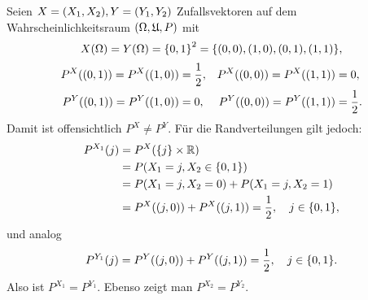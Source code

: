 \documentclass{lecture}
\begin{document}
    \begin{example}
        Seien \(X = \parentheses*{X_1, X_2}, Y = \parentheses*{Y_1, Y_2}\) Zufallsvektoren auf dem Wahrscheinlichkeitsraum \(\parentheses*{\Omega, \mathfrak{U}, P}\) mit
        \[
            X\parentheses*{\Omega} = Y\parentheses*{\Omega} = \braces*{0, 1}^2 = \braces*{\parentheses*{0, 0}, \parentheses*{1, 0}, \parentheses*{0, 1}, \parentheses*{1, 1}},
        \]
        \begin{align*}
            P^X\parentheses*{\parentheses*{0, 1}} = P^X\parentheses*{\parentheses*{1, 0}} &= \frac{1}{2}, & P^X\parentheses*{\parentheses*{0, 0}} = P^X\parentheses*{\parentheses*{1, 1}} &= 0,\\
            P^Y\parentheses*{\parentheses*{0, 1}} = P^Y\parentheses*{\parentheses*{1, 0}} &= 0, & P^Y\parentheses*{\parentheses*{0, 0}} = P^Y\parentheses*{\parentheses*{1, 1}} &= \frac{1}{2}.
        \end{align*}
        Damit ist offensichtlich \(P^X \ne P^Y\).
        Für die Randverteilungen gilt jedoch:
        \begin{align*}
            P^{X_1}\parentheses*{j} &= P^X\parentheses*{\braces*{j} \times \R}\\
            &= P\parentheses*{X_1 = j, X_2 \in \braces*{0, 1}}\\
            &= P\parentheses*{X_1 = j, X_2 = 0} + P\parentheses*{X_1 = j, X_2 = 1}\\
            &= P^X\parentheses*{\parentheses*{j, 0}} + P^X\parentheses*{\parentheses*{j, 1}} = \frac{1}{2}, \quad j \in \braces*{0, 1},
        \end{align*}
        und analog
        \[
            P^{Y_1}\parentheses*{j} = P^Y\parentheses*{\parentheses*{j, 0}} + P^Y\parentheses*{\parentheses*{j, 1}} = \frac{1}{2}, \quad j \in \braces*{0, 1}.
        \]
        Also ist \(P^{X_1} = P^{Y_1}\).
        Ebenso zeigt man \(P^{X_2} = P^{Y_2}\).
    \end{example}
\end{document}
